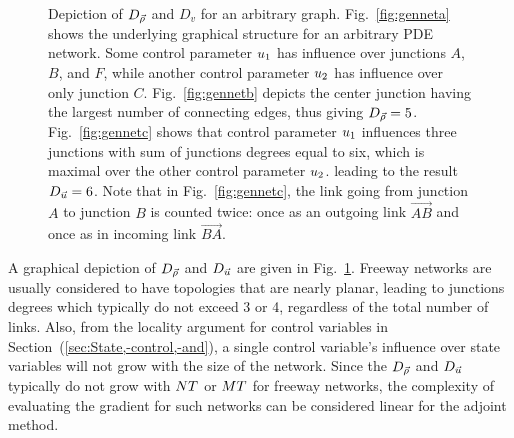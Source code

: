 \begin{figure}
\centering%
\hfill%
\hfill%
%
\caption[Depiction of $D_{\state}$ and $D_{v}$ for an arbitrary graph.]{Depiction of $D_{\state}$ and $D_{v}$ for an arbitrary graph. Fig.~\ref{fig:genneta}
shows the underlying graphical structure for an arbitrary PDE network.
Some control parameter $u_{1}$ has influence over junctions
$A$, $B$, and $F$, while another control parameter $u_{2}$
has influence over only junction $C$. Fig.~\ref{fig:gennetb}
depicts the center junction having the largest number of connecting
edges, thus giving $D_{\vec{\rho}}=5$. Fig.~\ref{fig:gennetc} shows
that control parameter $u_{1}$ influences three junctions with
sum of junctions degrees equal to six, which is maximal over the other
control parameter $u_{2}$. leading to the result $D_{\vec{u}}=6$.
Note that in Fig.~\ref{fig:gennetc}, the link going from junction
$A$ to junction $B$ is counted twice: once as an outgoing link $\vec{AB}$
and once as in incoming link $\vec{BA}$.\label{fig:Depicting--and}}%
\end{figure}

A graphical depiction of $D_{\state}$ and $D_{\vec{u}}$ are given
in Fig.~\ref{fig:Depicting--and}. Freeway networks are usually considered to have topologies that are
nearly planar, leading to junctions degrees which typically do not
exceed 3 or 4, regardless of the total number of links. Also, from
the locality argument for control variables in Section~(\ref{sec:State,-control,-and}),
a single control variable's influence over state variables will not
grow with the size of the network. Since the $D_{\vec{\rho}}$ and
$D_{\vec{u}}$ typically do not grow with $NT$ or
$MT$ for freeway networks, the complexity of evaluating
the gradient for such networks can be considered linear for the adjoint
method.


